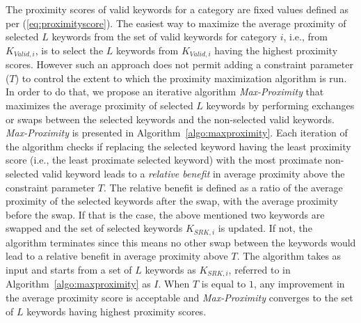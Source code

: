The proximity scores of valid keywords for a category are fixed values defined as per (\ref{eq:proximityscore}). The easiest way to maximize the average proximity of selected $L$ keywords from the set of valid keywords for category $i$, i.e., from $K_{Valid,i}$, is to select the $L$ keywords from $K_{Valid, i}$ having the highest proximity scores. However such an approach does not permit adding a constraint parameter ($T$) to control the extent to which the proximity maximization algorithm is run. In order to do that, we propose an iterative algorithm \textit{Max-Proximity} that maximizes the average proximity of selected $L$ keywords by performing exchanges or swaps between the selected keywords and the non-selected valid keywords. \textit{Max-Proximity} is presented in Algorithm~\ref{algo:maxproximity}. Each iteration of the algorithm checks if replacing the selected keyword having the least proximity score (i.e., the least proximate selected keyword) with the most proximate non-selected valid keyword leads to a \textit{relative benefit} in average proximity above the constraint parameter $T$. The relative benefit is defined as a ratio of the average proximity of the selected keywords after the swap, with the average proximity before the swap. If that is the case, the above mentioned two keywords are swapped and the set of selected keywords $K_{SRK,i}$ is updated. If not, the algorithm terminates since this means no other swap between the keywords would lead to a relative benefit in average proximity above $T$. The algorithm takes as input and starts from a set of $L$ keywords as $K_{SRK,i}$, referred to in Algorithm~\ref{algo:maxproximity} as $I$. When $T$ is equal to $1$, any improvement in the average proximity score is acceptable and \textit{Max-Proximity} converges to the set of $L$ keywords having highest proximity scores. 

